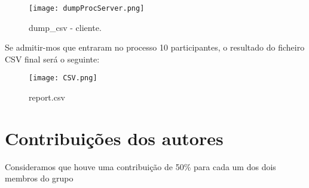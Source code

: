 \documentclass{report}
\begin{document}
\begin{figure}[hbt!]
  \centering
  \texttt{[image: dumpProcServer.png]}
  \caption{dump\_csv - cliente.}
\end{figure}
Se admitir-mos que entraram no processo 10 participantes, o resultado do ficheiro CSV final será o seguinte:
\begin{figure}[hbt!]
  \centering
  \texttt{[image: CSV.png]}
  \caption{report.csv}
\end{figure}

\chapter*{Contribuições dos autores}
Consideramos que houve uma contribuição de 50\% para cada um dos dois membros do grupo


\printbibliography
\end{document}
